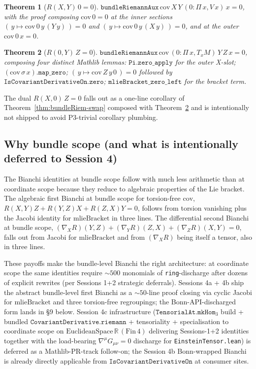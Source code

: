 \documentclass[twocolumn]{revtex4-2}
\newtheorem{theorem}{Theorem}
\begin{document}
\begin{theorem}[$R(X, Y)\,0 = 0$]\label{thm:bundleRiem-zero-section}
$\mathtt{bundleRiemannAux}\,\mathrm{cov}\,X\,Y\,(0 : \Pi\,x, V\,x)\,x
  = 0$, with the proof composing $\mathrm{cov}\,0 = 0$ at the inner
sections $(\,y \mapsto \mathrm{cov}\,0\,y\,(Y\,y)\,) = 0$ and
$(\,y \mapsto \mathrm{cov}\,0\,y\,(X\,y)\,) = 0$, and at the outer
$\mathrm{cov}\,0\,x = 0$.
\end{theorem}

\begin{theorem}[$R(0, Y)\,Z = 0$]\label{thm:bundleRiem-zero-X}
$\mathtt{bundleRiemannAux}\,\mathrm{cov}\,(0 : \Pi\,x, T_xM)\,Y\,Z\,x
  = 0$, composing four distinct Mathlib lemmas:
$\mathtt{Pi.zero\_apply}$ for the outer X-slot;
$(\mathrm{cov}\,\sigma\,x).\mathtt{map\_zero}$;
$(\,y \mapsto \mathrm{cov}\,Z\,y\,0\,) = 0$ followed by
$\mathtt{IsCovariantDerivativeOn.zero}$;
$\mathtt{mlieBracket\_zero\_left}$ for the bracket term.
\end{theorem}

The dual $R(X, 0)\,Z = 0$ falls out as a one-line corollary of
Theorem~\ref{thm:bundleRiem-swap} composed with
Theorem~\ref{thm:bundleRiem-zero-X} and is intentionally not shipped
to avoid P3-trivial corollary plumbing.

\subsection{Why bundle scope (and what is intentionally deferred to
Session 4)}\label{sec:bundle-aux-defer}
The Bianchi identities at bundle scope follow with much less arithmetic
than at coordinate scope because they reduce to algebraic properties
of the Lie bracket. The algebraic first Bianchi at bundle scope for
torsion-free $\mathrm{cov}$, $R(X, Y) Z + R(Y, Z) X + R(Z, X) Y = 0$,
follows from torsion vanishing plus the Jacobi identity for
$\mathrm{mlieBracket}$ in three lines. The differential second Bianchi
at bundle scope, $(\nabla_X R)(Y, Z) + (\nabla_Y R)(Z, X) + (\nabla_Z R)
(X, Y) = 0$, falls out from Jacobi for $\mathrm{mlieBracket}$ and from
$(\nabla_X R)$ being itself a tensor, also in three lines.

These payoffs make the bundle-level Bianchi the right architecture:
at coordinate scope the same identities require $\sim 500$ monomials
of \texttt{ring}-discharge after dozens of explicit rewrites (per
Sessions 1+2 strategic deferrals). Sessions 4a + 4b ship the abstract
bundle-level first Bianchi as a $\sim 50$-line proof closing via cyclic
Jacobi for $\mathrm{mlieBracket}$ and three torsion-free regroupings;
the Bonn-API-discharged form lands in \S 9 below. Session 4c
infrastructure ($\texttt{TensorialAt.mkHom}_3$ build + bundled
$\texttt{CovariantDerivative.riemann}$ + tensoriality + specialisation
to coordinate scope on $\mathrm{EuclideanSpace}\,\mathbb{R}\,(\mathrm{Fin}\,4)$
delivering Sessions-1+2 identities together with the load-bearing
$\nabla^{\mu}G_{\mu\nu} = 0$ discharge for \texttt{EinsteinTensor.lean})
is deferred as a Mathlib-PR-track follow-on; the Session 4b
Bonn-wrapped Bianchi is already directly applicable from
$\texttt{IsCovariantDerivativeOn}$ at consumer sites.
\end{document}
